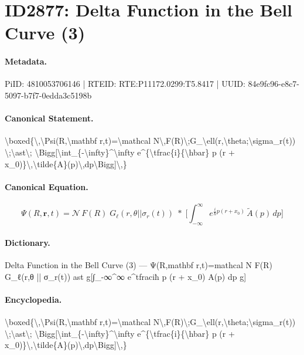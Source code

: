 \section*{ID2877: Delta Function in the Bell Curve (3)}
\paragraph{Metadata.}
PiID: 4810053706146 | RTEID: RTE:P11172.0299:T5.8417 | UUID: 84e9fc96-e8c7-5097-b7f7-0edda3c5198b

\paragraph{Canonical Statement.}
\textbackslash{}boxed\{\textbackslash{},\textbackslash{}Psi(R,\textbackslash{}mathbf r,t)=\textbackslash{}mathcal N\textbackslash{},F(R)\textbackslash{};G\_\textbackslash{}ell(r,\textbackslash{}theta;\textbackslash{}sigma\_r(t)) \textbackslash{};\textbackslash{}ast\textbackslash{}; \textbackslash{}Bigg[\textbackslash{}int\_\{-\textbackslash{}infty\}\textasciicircum{}\textbackslash{}infty e\textasciicircum{}\{\textbackslash{}tfrac\{i\}\{\textbackslash{}hbar\} p (r + x\_0)\}\textbackslash{},\textbackslash{}tilde\{A\}(p)\textbackslash{},dp\textbackslash{}Bigg]\textbackslash{},\}

\paragraph{Canonical Equation.}
\[
\boxed{\,\Psi(R,\mathbf r,t)=\mathcal N\,F(R)\;G_\ell(r,\theta || \sigma_r(t)) \;\ast\; \Bigg[\int_{-\infty}^\infty e^{\tfrac{i}{\hbar} p (r + x_0)}\,\tilde{A}(p)\,dp\Bigg]\,}
\]

\paragraph{Dictionary.}
Delta Function in the Bell Curve (3) — Ψ(R,mathbf r,t)=mathcal N F(R) G\_ℓ(r,θ || σ\_r(t)) ast g[∫\_-∞\textasciicircum{}∞ e\textasciicircum{}tfraciħ p (r + x\_0) A(p) dp g]

\paragraph{Encyclopedia.}
\textbackslash{}boxed\{\textbackslash{},\textbackslash{}Psi(R,\textbackslash{}mathbf r,t)=\textbackslash{}mathcal N\textbackslash{},F(R)\textbackslash{};G\_\textbackslash{}ell(r,\textbackslash{}theta;\textbackslash{}sigma\_r(t)) \textbackslash{};\textbackslash{}ast\textbackslash{}; \textbackslash{}Bigg[\textbackslash{}int\_\{-\textbackslash{}infty\}\textasciicircum{}\textbackslash{}infty e\textasciicircum{}\{\textbackslash{}tfrac\{i\}\{\textbackslash{}hbar\} p (r + x\_0)\}\textbackslash{},\textbackslash{}tilde\{A\}(p)\textbackslash{},dp\textbackslash{}Bigg]\textbackslash{},\}
